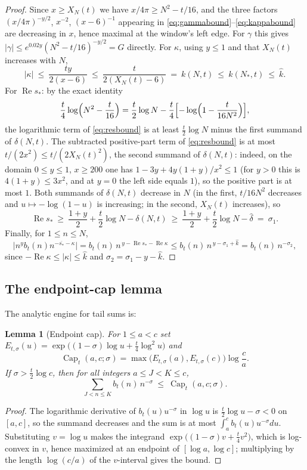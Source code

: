 \documentclass[11pt]{article}
\newtheorem{lemma}[theorem]{Lemma}
\theoremstyle{definition}
\newcommand{\CapT}{\operatorname{Cap}}
\DeclareMathOperator{\Rea}{Re}
\begin{document}
\begin{proof}
Since $x\ge X_N(t)$ we have $x/4\pi\ge N^2-t/16$, and the three
factors $(x/4\pi)^{-y/2}$, $x^{-2}$, $(x-6)^{-1}$ appearing in
\eqref{eq:gammabound}--\eqref{eq:kappabound} are decreasing in $x$,
hence maximal at the window's
left edge. For $\gamma$ this gives
$|\gamma|\le e^{0.02y}(N^2-t/16)^{-y/2}=G$ directly. For $\kappa$,
using $y\le1$ and that $X_N(t)$ increases with $N$,
\[
|\kappa|\ \le\ \frac{ty}{2(x-6)}\ \le\ \frac{t}{2(X_N(t)-6)}
\ =\ k(N,t)\ \le\ k(N_*,t)\ \le\ \widehat k .
\]
For $\Rea s_*$: by the exact identity
\[
\frac t4\log\Bigl(N^2-\frac t{16}\Bigr)
=\frac t2\log N
-\frac t4\Bigl[-\log\Bigl(1-\frac t{16N^2}\Bigr)\Bigr],
\]
the logarithmic term of \eqref{eq:resbound} is at least
$\frac t2\log N$ minus the first summand of $\delta(N,t)$. The
subtracted positive-part term of \eqref{eq:resbound} is at most
$t/(2x^2)\le t/(2X_N(t)^2)$, the second summand of $\delta(N,t)$:
indeed, on the domain $0\le y\le1$, $x\ge200$ one has
$1-3y+4y(1+y)/x^2\le1$ (for $y>0$ this is $4(1+y)\le3x^2$, and at
$y=0$ the left side equals $1$), so the positive part is at most
$1$. Both summands of $\delta(N,t)$ decrease in $N$ (in the first,
$t/16N^2$ decreases and $u\mapsto-\log(1-u)$ is increasing; in the
second, $X_N(t)$ increases), so
\[
\Rea s_*\ \ge\ \frac{1+y}2+\frac t2\log N-\delta(N,t)
\ \ge\ \frac{1+y}2+\frac t2\log N-\widehat\delta\ =\ \sigma_1 .
\]
Finally, for $1\le n\le N$,
\[
\bigl|n^y b_t(n)n^{-\overline{s_*}-\kappa}\bigr|
= b_t(n)\,n^{\,y-\Rea s_*-\Rea\kappa}
\le b_t(n)\,n^{\,y-\sigma_1+\widehat k}
= b_t(n)\,n^{-\sigma_2},
\]
since $-\Rea\kappa\le|\kappa|\le\widehat k$ and
$\sigma_2=\sigma_1-y-\widehat k$.
\end{proof}

\subsection{The endpoint-cap lemma}

The analytic engine for tail sums is:

\begin{lemma}[Endpoint cap]\label{lem:cap}
For $1\le a<c$ set
$E_{t,\sigma}(u)=\exp\bigl((1-\sigma)\log u+\frac t4\log^2u\bigr)$ and
\[
\CapT_t(a,c;\sigma)=\max\bigl(E_{t,\sigma}(a),E_{t,\sigma}(c)\bigr)\log\frac ca .
\]
If $\sigma>\frac t2\log c$, then for all integers $a\le J<K\le c$,
\[
\sum_{J<n\le K}b_t(n)\,n^{-\sigma}\ \le\ \CapT_t(a,c;\sigma).
\]
\end{lemma}

\begin{proof}
The logarithmic derivative of $b_t(u)u^{-\sigma}$ in $\log u$ is
$\frac t2\log u-\sigma<0$ on $[a,c]$, so the summand decreases and the
sum is at most $\int_a^c b_t(u)u^{-\sigma}du$. Substituting
$v=\log u$ makes the integrand $\exp\bigl((1-\sigma)v+\frac t4v^2\bigr)$,
which is log-convex in $v$, hence maximized at an endpoint of
$[\log a,\log c]$; multiplying by the length $\log(c/a)$ of the
$v$-interval gives the bound.
\end{proof}
\end{document}
